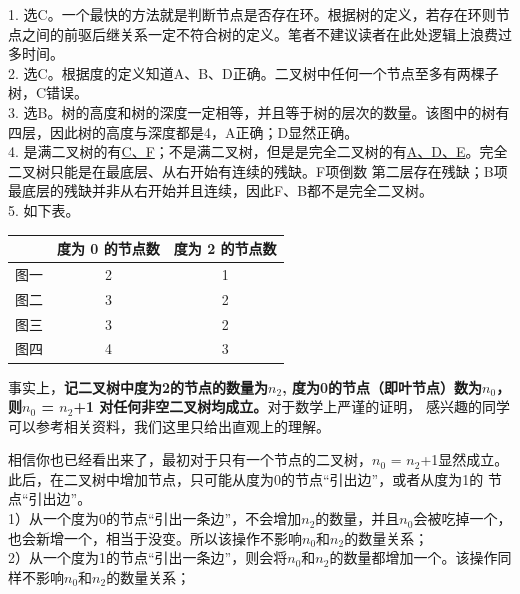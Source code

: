 %
%
1. 选C。一个最快的方法就是判断节点是否存在环。根据树的定义，若存在环则节点之间的前驱后继关系一定不符合树的定义。笔者不建议读者在此处逻辑上浪费过多时间。\\

2. 选C。根据度的定义知道A、B、D正确。二叉树中任何一个节点至多有两棵子树，C错误。\\

3. 选B。树的高度和树的深度一定相等，并且等于树的层次的数量。该图中的树有四层，因此树的高度与深度都是4，A正确；D显然正确。\\

4. 是满二叉树的有\underline{C、F}；不是满二叉树，但是是完全二叉树的有\underline{A、D、E}。完全二叉树只能是在最底层、从右开始有连续的残缺。F项倒数
第二层存在残缺；B项最底层的残缺并非从右开始并且连续，因此F、B都不是完全二叉树。\\

5. 如下表。
\begin{center}
    \begin{tabular}{|c|c|c|}
        \hline
         & 度为 0 的节点数 & 度为 2 的节点数 \\
        \hline
        图一 & 2 & 1 \\
        \hline
        图二 & 3 & 2 \\
        \hline
        图三 & 3 & 2 \\
        \hline
        图四 & 4 & 3 \\
        \hline
    \end{tabular}
\end{center}
事实上，\textbf{记二叉树中度为2的节点的数量为\(n_2\), 度为0的节点（即叶节点）数为\(n_0\)， 则\(n_0\) = \(n_2\)+1 对任何非空二叉树均成立。}对于数学上严谨的证明，
感兴趣的同学可以参考相关资料，我们这里只给出直观上的理解。

相信你也已经看出来了，最初对于只有一个节点的二叉树，\(n_0\) = \(n_2\)+1显然成立。此后，在二叉树中增加节点，只可能从度为0的节点“引出边”，或者从度为1的
节点“引出边”。\\
1）从一个度为0的节点“引出一条边”，不会增加\(n_2\)的数量，并且\(n_0\)会被吃掉一个，也会新增一个，相当于没变。所以该操作不影响\(n_0\)和\(n_2\)的数量关系；\\
2）从一个度为1的节点“引出一条边”，则会将\(n_0\)和\(n_2\)的数量都增加一个。该操作同样不影响\(n_0\)和\(n_2\)的数量关系；

